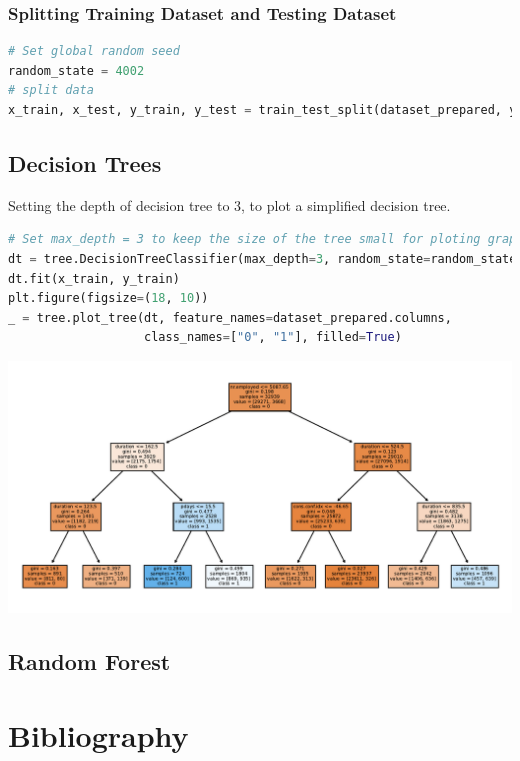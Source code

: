 \documentclass[11pt,a4paper]{article}
\begin{document}
    
    \subsubsection{Splitting Training Dataset and Testing Dataset}
\begin{lstlisting}[language = Python]
# Set global random seed
random_state = 4002
# split data
x_train, x_test, y_train, y_test = train_test_split(dataset_prepared, y, test_size=0.2, random_state=random_state)
\end{lstlisting}
    
    
    \subsection{Decision Trees} \label{decision_trees}
    Setting the depth of decision tree to 3, to plot a simplified decision tree.
\begin{lstlisting}[language = Python]
# Set max_depth = 3 to keep the size of the tree small for ploting graph
dt = tree.DecisionTreeClassifier(max_depth=3, random_state=random_state)
dt.fit(x_train, y_train)
plt.figure(figsize=(18, 10))
_ = tree.plot_tree(dt, feature_names=dataset_prepared.columns,
                   class_names=["0", "1"], filled=True)
\end{lstlisting}
    \begin{center}
        \includegraphics[width=.9\textwidth]{plot/classification/decision_tree.pdf}
    \end{center}
    
    \subsection{Random Forest} \label{random_forest}
    
    
    
    \newpage
    \section{Bibliography}
\end{document}
